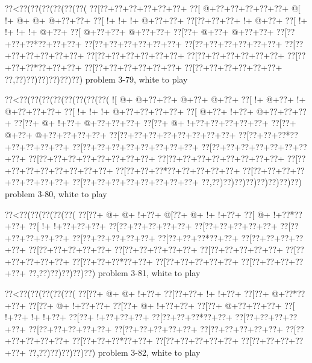 \vbox{\vbox{\goo
\0??<\0??(\0??(\0??(\0??(\0??(\0??(
\0??[\0??+\0??+\0??+\0??+\0??+\0??+
\0??[\- @+\0??+\0??+\0??+\0??+\0??+
\- @[\- !+\- @+\- @+\- @+\0??+\0??+
\0??[\- !+\- !+\- !+\- @+\0??+\0??+
\0??[\0??+\0??+\0??+\- !+\- @+\0??+
\0??[\- !+\- !+\- !+\- !+\- @+\0??+
\0??[\- @+\0??+\0??+\- @+\0??+\0??+
\0??[\0??+\- @+\0??+\- @+\0??+\0??+
\0??[\0??+\0??+\0??*\0??+\0??+\0??+
\0??[\0??+\0??+\0??+\0??+\0??+\0??+
\0??[\0??+\0??+\0??+\0??+\0??+\0??+
\0??[\0??+\0??+\0??+\0??+\0??+\0??+
\0??[\0??+\0??+\0??+\0??+\0??+\0??+
\0??[\0??+\0??+\0??+\0??+\0??+\0??+
\0??[\0??+\0??+\0??*\0??+\0??+\0??+
\0??[\0??+\0??+\0??+\0??+\0??+\0??+
\0??[\0??+\0??+\0??+\0??+\0??+\0??+
\0??,\0??)\0??)\0??)\0??)\0??)\0??)
}
\hfil problem 3-79, white to play\hfil\break
}

\vbox{\vbox{\goo
\0??<\0??(\0??(\0??(\0??(\0??(\0??(\0??(\0??(
\- ![\- @+\- @+\0??+\0??+\- @+\0??+\- @+\0??+
\0??[\- !+\- @+\0??+\- !+\- @+\0??+\0??+\0??+
\0??[\- !+\- !+\- !+\- @+\0??+\0??+\0??+\0??+
\0??[\- @+\0??+\- !+\0??+\- @+\0??+\0??+\0??+
\0??[\0??+\- @+\- !+\0??+\- @+\0??+\0??+\0??+
\0??[\0??+\- @+\- !+\0??+\0??+\0??+\0??+\0??+
\0??[\0??+\- @+\0??+\- @+\0??+\0??+\0??+\0??+
\0??[\0??+\0??+\0??+\0??+\0??+\0??+\0??+\0??+
\0??[\0??+\0??+\0??*\0??+\0??+\0??+\0??+\0??+
\0??[\0??+\0??+\0??+\0??+\0??+\0??+\0??+\0??+
\0??[\0??+\0??+\0??+\0??+\0??+\0??+\0??+\0??+
\0??[\0??+\0??+\0??+\0??+\0??+\0??+\0??+\0??+
\0??[\0??+\0??+\0??+\0??+\0??+\0??+\0??+\0??+
\0??[\0??+\0??+\0??+\0??+\0??+\0??+\0??+\0??+
\0??[\0??+\0??+\0??*\0??+\0??+\0??+\0??+\0??+
\0??[\0??+\0??+\0??+\0??+\0??+\0??+\0??+\0??+
\0??[\0??+\0??+\0??+\0??+\0??+\0??+\0??+\0??+
\0??,\0??)\0??)\0??)\0??)\0??)\0??)\0??)\0??)
}
\hfil problem 3-80, white to play\hfil\break
}

\vbox{\vbox{\goo
\0??<\0??(\0??(\0??(\0??(\0??(
\0??[\0??+\- @+\- @+\- !+\0??+
\- @[\0??+\- @+\- !+\- !+\0??+
\0??[\- @+\- !+\0??*\0??+\0??+
\0??[\- !+\- !+\0??+\0??+\0??+
\0??[\0??+\0??+\0??+\0??+\0??+
\0??[\0??+\0??+\0??+\0??+\0??+
\0??[\0??+\0??+\0??+\0??+\0??+
\0??[\0??+\0??+\0??+\0??+\0??+
\0??[\0??+\0??+\0??*\0??+\0??+
\0??[\0??+\0??+\0??+\0??+\0??+
\0??[\0??+\0??+\0??+\0??+\0??+
\0??[\0??+\0??+\0??+\0??+\0??+
\0??[\0??+\0??+\0??+\0??+\0??+
\0??[\0??+\0??+\0??+\0??+\0??+
\0??[\0??+\0??+\0??*\0??+\0??+
\0??[\0??+\0??+\0??+\0??+\0??+
\0??[\0??+\0??+\0??+\0??+\0??+
\0??,\0??)\0??)\0??)\0??)\0??)
}
\hfil problem 3-81, white to play\hfil\break
}

\vbox{\vbox{\goo
\0??<\0??(\0??(\0??(\0??(\0??(
\0??[\0??+\- @+\- @+\- !+\0??+
\0??[\0??+\0??+\- !+\- !+\0??+
\0??[\0??+\- @+\0??*\0??+\0??+
\0??[\0??+\- @+\- !+\0??+\0??+
\0??[\0??+\- @+\- !+\0??+\0??+
\0??[\0??+\- @+\0??+\0??+\0??+
\0??[\- !+\0??+\- !+\- !+\0??+
\0??[\0??+\- !+\0??+\0??+\0??+
\0??[\0??+\0??+\0??*\0??+\0??+
\0??[\0??+\0??+\0??+\0??+\0??+
\0??[\0??+\0??+\0??+\0??+\0??+
\0??[\0??+\0??+\0??+\0??+\0??+
\0??[\0??+\0??+\0??+\0??+\0??+
\0??[\0??+\0??+\0??+\0??+\0??+
\0??[\0??+\0??+\0??*\0??+\0??+
\0??[\0??+\0??+\0??+\0??+\0??+
\0??[\0??+\0??+\0??+\0??+\0??+
\0??,\0??)\0??)\0??)\0??)\0??)
}
\hfil problem 3-82, white to play\hfil\break
}


